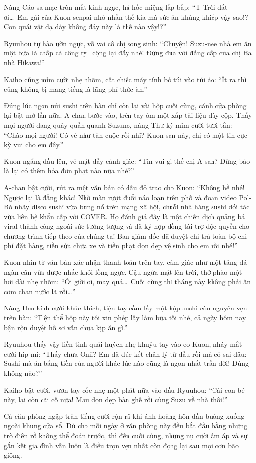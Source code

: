 \documentclass[../main.tex]{subfiles}
\begin{document}
Nàng Cáo sa mạc tròn mắt kinh ngạc, há hốc miệng lắp bắp: ``T-Trời đất ơi\dots\ Em gái của Kuon-senpai nhỏ nhắn thế kia mà sức ăn khủng khiếp vậy sao!? Con quái vật dạ dày không đáy này là thế nào vậy!?''

Ryuuhou tự hào ưỡn ngực, vỗ vai cô chị song sinh: ``Chuyện! Suzu-nee nhà em ăn một bữa là chấp cả công ty \hll\ cộng lại đấy nhé! Đừng đùa với đẳng cấp của chị Ba nhà Hikawa!''

Kaiho cũng mỉm cười nhẹ nhõm, cất chiếc máy tính bỏ túi vào túi áo: ``Ít ra thì cũng không bị mang tiếng là lãng phí thức ăn.''

Đúng lúc ngọn núi sushi trên bàn chỉ còn lại vài hộp cuối cùng, cánh cửa phòng lại bật mở lần nữa. A-chan bước vào, trên tay ôm một xấp tài liệu dày cộp. Thấy mọi người đang quây quần quanh Suzuno, nàng Thư ký mỉm cười tươi tắn: ``Chào mọi người! Có vẻ như tàn cuộc rồi nhỉ? Kuon-san này, chị có một tin cực kỳ vui cho em đây.''

Kuon ngẩng đầu lên, vẻ mặt đầy cảnh giác: ``Tin vui gì thế chị A-san? Đừng bảo là lại có thêm hóa đơn phạt nào nữa nhé?''

A-chan bật cười, rút ra một văn bản có dấu đỏ trao cho Kuon: ``Không hề nhé! Ngược lại là đằng khác! Nhờ màn rượt đuổi náo loạn trên phố và đoạn video Pol-Bò nhảy disco sushi vừa bùng nổ trên mạng xã hội, chuỗi nhà hàng sushi đối tác vừa liên hệ khẩn cấp với COVER. Họ đánh giá đây là một chiến dịch quảng bá viral thành công ngoài sức tưởng tượng và đã ký hợp đồng tài trợ độc quyền cho chương trình tiếp theo của chúng ta! Ban giám đốc đã duyệt chi trả toàn bộ chi phí đặt hàng, tiền sửa chữa xe và tiền phạt dọn dẹp vệ sinh cho em rồi nhé!''

Kuon nhìn tờ văn bản xác nhận thanh toán trên tay, cảm giác như một tảng đá ngàn cân vừa được nhấc khỏi lồng ngực. Cậu ngửa mặt lên trời, thở phào một hơi dài nhẹ nhõm: ``Ôi giời ơi, may quá\dots\ Cuối cùng thì tháng này không phải ăn cơm chan nước lã rồi\dots''

Nàng Đeo kính cười khúc khích, tiện tay cầm lấy một hộp sushi còn nguyên vẹn trên bàn: ``Tiện thể hộp này tôi xin phép lấy làm bữa tối nhé, cả ngày hôm nay bận rộn duyệt hồ sơ vẫn chưa kịp ăn gì.''

Ryuuhou thấy vậy liền tinh quái huých nhẹ khuỷu tay vào eo Kuon, nháy mắt cười híp mí: ``Thấy chưa Onii? Em đã đúc kết chân lý từ đầu rồi mà có sai đâu: Sushi mà ăn bằng tiền của người khác lúc nào cũng là ngon nhất trần đời! Đúng không nào?''

Kaiho bật cười, vươn tay cốc nhẹ một phát nữa vào đầu Ryuuhou: ``Cái con bé này, lại còn cãi cố nữa! Mau dọn dẹp bàn ghế rồi cùng Suzu về nhà thôi!''

Cả căn phòng ngập tràn tiếng cười rộn rã khi ánh hoàng hôn dần buông xuống ngoài khung cửa sổ. Dù cho mỗi ngày ở văn phòng này đều bắt đầu bằng những trò điên rồ không thể đoán trước, thì đến cuối cùng, những nụ cười ấm áp và sự gắn kết gia đình vẫn luôn là điều trọn vẹn nhất còn đọng lại sau mọi cơn bão giông.
\end{document}
